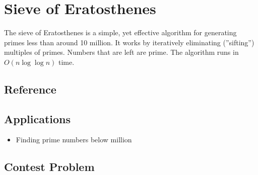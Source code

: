\section{Sieve of Eratosthenes}
The sieve of Eratosthenes is a simple, yet effective algorithm for generating primes less than around 10 million.
It works by iteratively eliminating (''sifting'') multiples of primes.
Numbers that are left are prime.
The algorithm runs in $O(n\log\log n)$ time.

\subsection{Reference}


\subsection{Applications}
\begin{itemize}
	\item	Finding prime numbers below  million
\end{itemize}

\subsection{Contest Problem}
